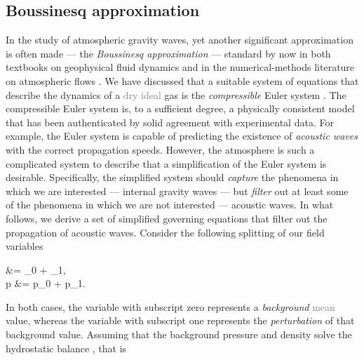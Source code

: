 \documentclass[../main.tex]{subfiles}
\begin{document}
\subsection{Boussinesq approximation}
\label{sec:BOUSSINESQ}

In the study of atmospheric gravity waves, yet another significant approximation is often made --- the \emph{Boussinesq approximation} --- standard by now in both textbooks on geophysical fluid dynamics \autocite{vallisAtmosphericOceanicFluid2017,holtonIntroductionDynamicMeteorology2013} and in the numerical-methods literature on atmospheric flows \autocite{durranNumericalMethodsFluid2010,teixeiraPhysicsOrographicGravity2014}. 
We have discussed that a suitable system of equations that describe the dynamics of a \textcolor{gray}{dry ideal} gas is the \emph{compressible} Euler system . The compressible Euler system is, to a sufficient degree, a physically consistent model that has been authenticated by solid agreement with experimental data. For example, the Euler system is capable of predicting the existence of \emph{acoustic waves} with the correct propagation speeds. 
However, the atmosphere is such a complicated system to describe that a simplification of the Euler system is desirable. Specifically, the simplified system should \emph{capture} the phenomena in which we are interested --- internal gravity waves --- but \emph{filter} out at least some of the phenomena in which we are not interested --- acoustic waves. In what follows, we derive a set of simplified governing equations that filter out the propagation of acoustic waves. 
Consider the following splitting of our field variables

\begin{equations}[columns,*]
	\rho &= \rho_0 + \rho_{1},\\
	p &= p_0 + p_1.
\end{equations}

In both cases, the variable with subscript zero represents a \emph{background} \textcolor{gray}{mean} value, whereas the variable with subscript one represents the \emph{perturbation} of that background value. Assuming that the background pressure and density solve the hydrostatic balance , that is 
\end{document}
